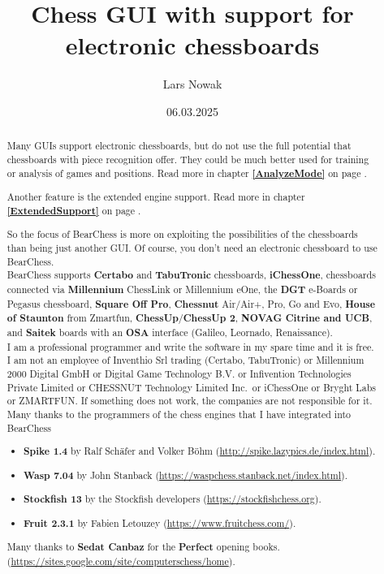 \documentclass[11pt,a4paper]{article}
\title{Chess GUI with support for electronic chessboards}
\author{Lars Nowak}
\date{06.03.2025}
\begin{document}
	\maketitle
	
	\begin{abstract}
		
		Many GUIs support electronic chessboards, but do not use the full potential that chessboards with piece recognition offer. They could be much better used for training or analysis of games and positions. Read more in chapter \textbf{\ref{AnalyzeMode}  } on page \pageref{AnalyzeMode}.
		
		Another feature is the extended engine support. Read more in chapter \textbf{\ref{ExtendedSupport}  } on page \pageref{ExtendedSupport}.
		
		So the focus of BearChess is more on exploiting the possibilities of the chessboards than being just another GUI. Of course, you don't need an electronic chessboard to use BearChess.\\
		
		BearChess supports \textbf{Certabo} and \textbf{TabuTronic} chessboards, \textbf{iChessOne}, chessboards connected via \textbf{Millennium} ChessLink or Millennium eOne, the \textbf{DGT} e-Boards or Pegasus chessboard, \textbf{Square Off Pro}, \textbf{Chessnut} Air/Air+, Pro, Go and Evo,
		\textbf{House of Staunton} from Zmartfun, \textbf{ChessUp}/\textbf{ChessUp 2}, \textbf{NOVAG Citrine and UCB}, and \textbf{Saitek} boards with an \textbf{OSA} interface (Galileo, Leornado, Renaissance).\\
		
		I am a professional programmer and write the software in my spare time and it is free. I am not an employee of Inventhio Srl trading (Certabo, TabuTronic) or Millennium 2000 Digital GmbH or Digital Game Technology B.V. or Infivention Technologies Private Limited or CHESSNUT Technology Limited Inc.\ or iChessOne or Bryght Labs or ZMARTFUN. If something does not work, the companies are not responsible for it.\\
		\newpage
        Many thanks to the programmers of the chess engines that I have integrated into BearChess
	 	\begin{itemize}
	 	  \item \textbf{Spike 1.4} by Ralf Schäfer and Volker Böhm (\url{http://spike.lazypics.de/index.html}).
	 	  \item \textbf{Wasp 7.04} by John Stanback (\url{https://waspchess.stanback.net/index.html}).
	 	  \item \textbf{Stockfish 13} by the Stockfish developers (\url{https://stockfishchess.org}).        
	 	  \item \textbf{Fruit 2.3.1} by Fabien Letouzey (\url{https://www.fruitchess.com/}).                
  	    \end{itemize}	
  	    Many thanks to \textbf{Sedat Canbaz} for the \textbf{Perfect} opening books.
  	    (\url{https://sites.google.com/site/computerschess/home}).  \\
  	    	

\end{abstract}
\end{document}

